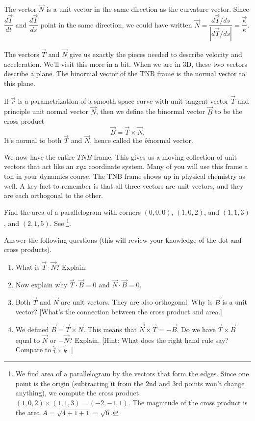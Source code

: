The vector $\vec N$ is a unit vector in the same direction as the curvature vector.  Since $\dfrac{d\vec T}{dt}$ and $\dfrac{d\vec T}{ds}$ point in the same direction, we could have written $\vec N = \dfrac{d\vec T/ds}{|d\vec T/ds|} = \dfrac{\vec \kappa}{\kappa}$.

The vectors $\vec T$ and $\vec N$ give us exactly the pieces needed to describe velocity and acceleration.  We'll visit this more in a bit.  When we are in 3D, these two vectors describe a plane. The binormal vector of the TNB frame is the normal vector to this plane.  

\begin{definition}
 If $\vec r$ is a parametrization of a smooth space curve with unit tangent vector $\vec T$ and principle unit normal vector $\vec N$, then we define the binormal vector $\vec B$ to be the cross product
$$\vec B = \vec T\times \vec N.$$
 It's normal to both $\vec T$ and $\vec N$, hence called the \textit{bi}normal vector.
\end{definition}

We now have the entire $TNB$ frame.  This gives us a moving collection of unit vectors that act like an $xyz$ coordinate system.  Many of you will use this frame a ton in your dynamics course. The TNB frame shows up in physical chemistry as well. A key fact to remember is that all three vectors are unit vectors, and they are each orthogonal to the other.

\begin{review*}
 Find the area of a parallelogram with corners $(0,0,0)$, $(1,0,2)$, and $(1,1,3)$, and $(2,1,5)$.  See \footnote{
We find area of a parallelogram by the vectors that form the edges. Since one point is the origin (subtracting it from the 2nd and 3rd points won't change anything), we compute the cross product
$(1,0,2)\times 
(1,1,3) 
= (-2,-1,1) $. The magnitude of the cross product is the area $A = \sqrt{4+1+1}=\sqrt{6}$.
}.
\end{review*}


\begin{problem}
Answer the following questions (this will review your knowledge of the dot and cross products).
\begin{enumerate}
	\item What is $\vec T\cdot \vec N$? Explain. 
	\item Now explain why $\vec T\cdot \vec B=0$ and $\vec N\cdot \vec B=0$.
	\item Both $\vec T$ and $\vec N$ are unit vectors. They are also orthogonal. Why is $\vec B$ is a unit vector? [What's the connection between the cross product and area.] 
	\item We defined $\vec B=\vec T\times \vec N$. This means that $\vec N\times \vec T=-\vec B$.  Do we have $\vec T\times \vec B$ equal to $\vec N$ or $-\vec N$? Explain. [Hint: What does the right hand rule say? Compare to $\hat i\times \hat k$. ]
\end{enumerate}
\end{problem}

